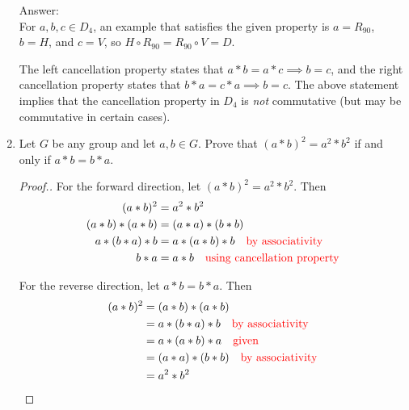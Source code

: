 \documentclass[11pt,twoside]{article}
\begin{document}
\begin{enumerate}
{\color{red}Answer:}\\
For $a,b,c \in D_4$, an example that satisfies the given property is $a = R_{90}$, $b = H$, and $c = V$, so $H \circ R_{90} = R_{90} \circ V = D$.

The left cancellation property states that $a \ast b = a \ast c \implies b = c$, and the right cancellation property states that $b \ast a = c \ast a \implies b=c$.  The above statement implies that the cancellation property in $D_4$ is \emph{not} commutative (but may be commutative in certain cases).

\vspace{0.5cm}



\vspace{0.5cm}

\item  Let $G$ be any group and let $a,b \in G$.  Prove that $(a \ast b)^2 = a^2 \ast b^2$ if and only if $a \ast b = b \ast a$.

\begin{proof}[\color{red}Proof.]
For the forward direction, let $(a \ast b)^2 = a^2 \ast b^2$.  Then
\begin{align*}
(a \ast b)^2 &= a^2 \ast b^2\\
(a \ast b) \ast (a \ast b) &= (a \ast a) \ast (b \ast b)\\
a \ast (b \ast a) \ast b &= a \ast (a \ast b) \ast b \quad \text{\color{red}by associativity}\\
b \ast a &= a \ast b \quad \text{\color{red}using cancellation property}
\end{align*}

For the reverse direction, let $a \ast b = b \ast a$.  Then
\begin{align*}
(a \ast b)^2 &= (a \ast b) \ast (a \ast b)\\
&= a \ast (b \ast a) \ast b \quad \text{\color{red}by associativity}\\
&= a \ast (a \ast b) \ast a \quad \text{\color{red}given}\\
&= (a \ast a) \ast (b \ast b) \quad \text{\color{red}by associativity}\\
&= a^2 \ast b^2
\end{align*}
\end{proof}

\end{enumerate}
\end{document}
